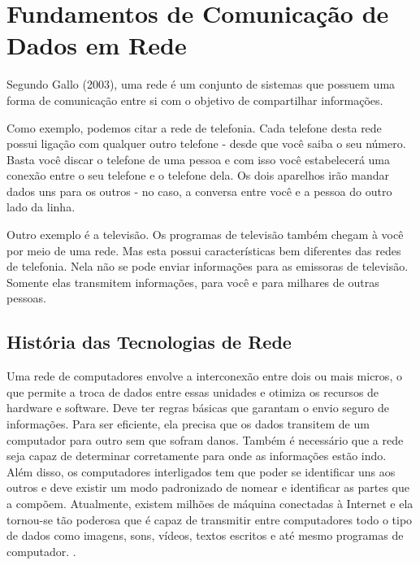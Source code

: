 \section{Fundamentos de Comunicação de Dados em Rede}
Segundo \nocite{gallo2003comunicaccao}Gallo (2003), uma rede é um conjunto de sistemas que possuem uma forma de comunicação entre si com o objetivo de compartilhar informações.

Como exemplo, podemos citar a rede de telefonia. Cada telefone desta rede possui ligação com qualquer outro telefone - desde que você saiba o seu número. Basta você discar o telefone de uma pessoa e com isso você estabelecerá uma conexão entre o seu telefone e o telefone dela. Os dois aparelhos irão mandar dados uns para os outros - no caso, a conversa entre você e a pessoa do outro lado da linha.

Outro exemplo é a televisão. Os programas de televisão também chegam à você por meio de uma rede. Mas esta possui características bem diferentes das redes de telefonia. Nela não se pode enviar informações para as emissoras de televisão. Somente elas transmitem informações, para você e para milhares de outras pessoas.

	\subsection{História das Tecnologias de Rede}
	Uma rede de computadores envolve a interconexão entre dois ou mais micros, o que permite a troca de dados entre essas unidades e otimiza os recursos de hardware e software. Deve ter regras básicas que garantam o envio seguro de informações. Para ser eficiente, ela precisa que os dados transitem de um computador para outro sem que sofram danos. Também é necessário que a rede seja capaz de determinar corretamente para onde as informações estão indo. Além disso, os computadores interligados tem que poder se identificar uns aos outros e deve existir um modo padronizado de nomear e identificar as partes que a compõem. Atualmente, existem milhões de máquina conectadas à Internet e ela tornou-se tão poderosa que é capaz de transmitir entre computadores todo o tipo de dados como imagens, sons, vídeos, textos escritos e até mesmo programas de computador. \cite{forouzan2009comunicaccao}.
	

